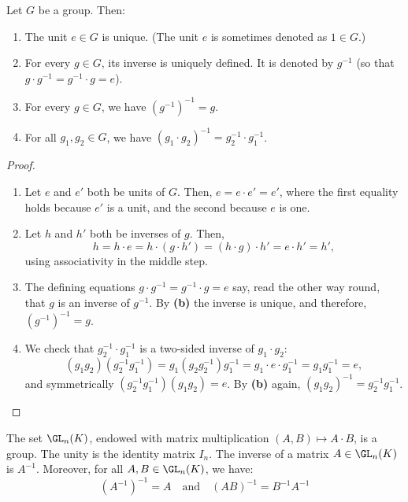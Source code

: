 \begin{proposition}
\label{prop:group_basic_properties}
Let $G$ be a group. Then:
\begin{enumerate}
    \item The unit $e \in G$ is unique. (The unit $e$ is sometimes denoted as $1 \in G$.)
    \item For every $g \in G$, its inverse is uniquely defined. It is denoted by $g^{-1}$ (so that $g \cdot g^{-1} = g^{-1} \cdot g = e$).
    \item For every $g \in G$, we have $(g^{-1})^{-1} = g$.
    \item For all $g_1, g_2 \in G$, we have $(g_1 \cdot g_2)^{-1} = g_2^{-1} \cdot g_1^{-1}$.
\end{enumerate}
\end{proposition}

\begin{proof}
\begin{enumerate}
    \item Let $e$ and $e'$ both be units of $G$. Then, $e = e \cdot e' = e'$, where the first equality holds because $e'$ is a unit, and the second because $e$ is one.
    \item Let $h$ and $h'$ both be inverses of $g$. Then,
    \[
    h = h \cdot e = h \cdot (g \cdot h') = (h \cdot g) \cdot h' = e \cdot h' = h',
    \]
    using associativity in the middle step.
    \item The defining equations $g \cdot g^{-1} = g^{-1} \cdot g = e$ say, read the other way round, that $g$ is an inverse of $g^{-1}$. By \textbf{(b)} the inverse is unique, and therefore, $(g^{-1})^{-1} = g$.
    \item We check that $g_2^{-1} \cdot g_1^{-1}$ is a two-sided inverse of $g_1 \cdot g_2$:
    \[
    (g_1 g_2)(g_2^{-1} g_1^{-1}) = g_1 (g_2 g_2^{-1}) g_1^{-1} = g_1 \cdot e \cdot g_1^{-1} = g_1 g_1^{-1} = e,
    \]
    and symmetrically $(g_2^{-1} g_1^{-1})(g_1 g_2) = e$. By \textbf{(b)} again, $(g_1 g_2)^{-1} = g_2^{-1} g_1^{-1}$.
\end{enumerate}
\end{proof}

\begin{proposition}
\label{prop:gl_group_structure}
The set $\GL_n(K)$, endowed with matrix multiplication $(A, B) \mapsto A \cdot B$, is a group. The unity is the identity matrix $I_n$. The inverse of a matrix $A \in \GL_n(K)$ is $A^{-1}$. Moreover, for all $A, B \in \GL_n(K)$, we have:
\begin{equation*}
    (A^{-1})^{-1} = A \quad \text{and} \quad (AB)^{-1} = B^{-1}A^{-1}
\end{equation*}
\end{proposition}

